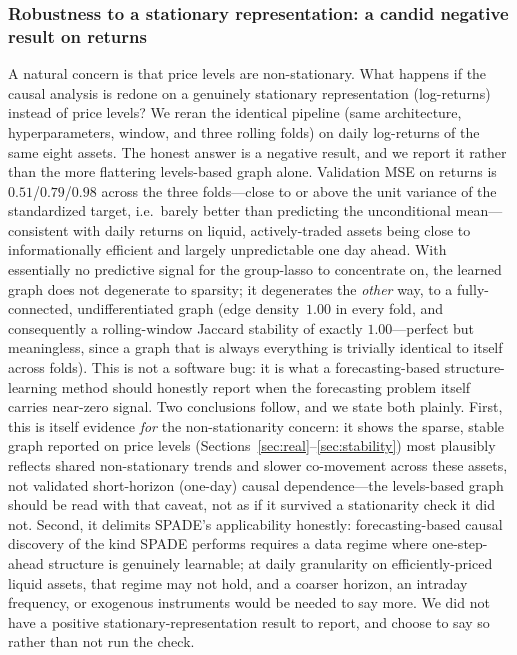 \subsubsection{Robustness to a stationary representation: a candid negative
result on returns}
\label{sec:returns}
A natural concern is that price levels are non-stationary. What happens if the causal analysis is redone on a genuinely stationary
representation (log-returns) instead of price levels? We reran the identical
pipeline (same
architecture, hyperparameters, window, and three rolling folds) on daily
log-returns of the same eight assets. The honest answer is a negative result,
and we report it rather than the more flattering levels-based graph alone.
Validation MSE on returns is $0.51$/$0.79$/$0.98$ across the three folds---close
to or above the unit variance of the standardized target, i.e.\ barely better
than predicting the unconditional mean---consistent with daily returns on
liquid, actively-traded assets being close to informationally efficient and
largely unpredictable one day ahead. With essentially no predictive signal for
the group-lasso to concentrate on, the learned graph does not degenerate to
sparsity; it degenerates the \emph{other} way, to a fully-connected,
undifferentiated graph (edge density~$1.00$ in every fold, and consequently a
rolling-window Jaccard stability of exactly $1.00$---perfect but meaningless,
since a graph that is always everything is trivially identical to itself
across folds). This is not a software bug: it is what a forecasting-based
structure-learning method should honestly report when the forecasting problem
itself carries near-zero signal. Two conclusions follow, and we state both
plainly. First, this is itself evidence \emph{for} the non-stationarity concern: it
shows the sparse, stable graph reported on price levels
(Sections~\ref{sec:real}--\ref{sec:stability}) most plausibly reflects shared
non-stationary trends and slower co-movement across these assets, not
validated short-horizon (one-day) causal dependence---the levels-based graph
should be read with that caveat, not as if it survived a stationarity check it
did not. Second, it delimits SPADE's applicability honestly: forecasting-based
causal discovery of the kind SPADE performs requires a data regime where
one-step-ahead structure is genuinely learnable; at daily granularity on
efficiently-priced liquid assets, that regime may not hold, and a coarser
horizon, an intraday frequency, or exogenous instruments would be needed to
say more. We did not have a positive stationary-representation result to
report, and choose to say so rather than not run the check.

